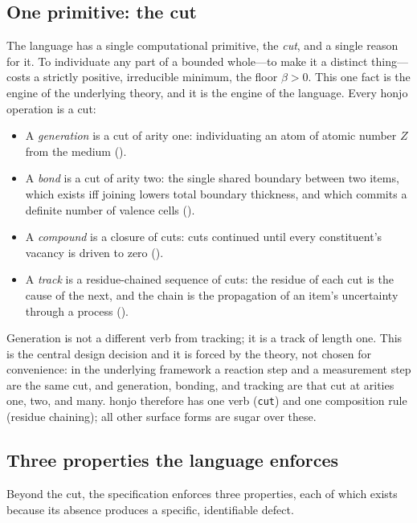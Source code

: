 \documentclass[11pt,twocolumn,a4paper]{article}
\theoremstyle{thmstyle}
\theoremstyle{definition}
\theoremstyle{remark}
\newcommand{\flo}{\beta}
\newcommand{\hj}[1]{\texttt{#1}}
\begin{document}
\subsection{One primitive: the cut}

The language has a single computational primitive, the \emph{cut}, and a
single reason for it. To individuate any part of a bounded whole---to
make it a distinct thing---costs a strictly positive, irreducible
minimum, the floor $\flo>0$. This one fact is the engine of the
underlying theory, and it is the engine of the language. Every honjo
operation is a cut:

\begin{itemize}[leftmargin=1.4em,itemsep=2pt]
\item A \emph{generation} is a cut of arity one: individuating an atom of
atomic number $Z$ from the medium ().
\item A \emph{bond} is a cut of arity two: the single shared boundary
between two items, which exists iff joining lowers total boundary
thickness, and which commits a definite number of valence cells
().
\item A \emph{compound} is a closure of cuts: cuts continued until every
constituent's vacancy is driven to zero ().
\item A \emph{track} is a residue-chained sequence of cuts: the residue
of each cut is the cause of the next, and the chain is the propagation of
an item's uncertainty through a process ().
\end{itemize}

Generation is not a different verb from tracking; it is a track of length
one. This is the central design decision and it is forced by the theory,
not chosen for convenience: in the underlying framework a reaction step
and a measurement step are the same cut, and generation, bonding, and
tracking are that cut at arities one, two, and many. honjo therefore has
one verb (\hj{cut}) and one composition rule (residue chaining); all
other surface forms are sugar over these.

\subsection{Three properties the language enforces}
\label{sec:three-properties}

Beyond the cut, the specification enforces three properties, each of
which exists because its absence produces a specific, identifiable
defect.
\end{document}
